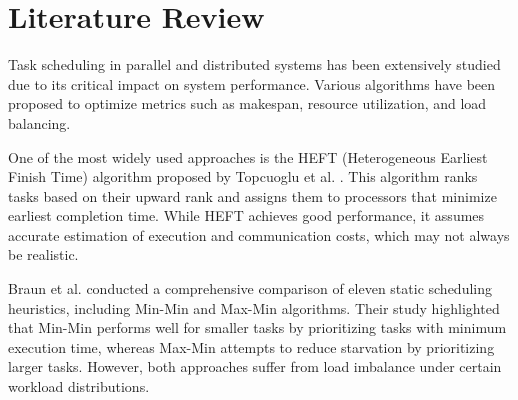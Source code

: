 \documentclass[12pt,a4paper]{article}
\begin{document}
	





\section{Literature Review}

Task scheduling in parallel and distributed systems has been extensively studied due to its critical impact on system performance. Various algorithms have been proposed to optimize metrics such as makespan, resource utilization, and load balancing.

One of the most widely used approaches is the HEFT (Heterogeneous Earliest Finish Time) algorithm proposed by Topcuoglu et al. \cite{topcuoglu}. This algorithm ranks tasks based on their upward rank and assigns them to processors that minimize earliest completion time. While HEFT achieves good performance, it assumes accurate estimation of execution and communication costs, which may not always be realistic.

Braun et al. \cite{braun} conducted a comprehensive comparison of eleven static scheduling heuristics, including Min-Min and Max-Min algorithms. Their study highlighted that Min-Min performs well for smaller tasks by prioritizing tasks with minimum execution time, whereas Max-Min attempts to reduce starvation by prioritizing larger tasks. However, both approaches suffer from load imbalance under certain workload distributions.
\end{document}
